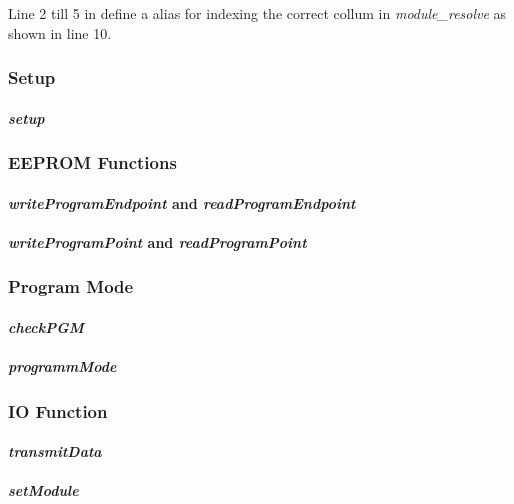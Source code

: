 

Line 2 till 5 in  define a alias for indexing the correct collum in \textit{module_resolve} as shown in line 10.

\subsubsection{Setup}
\paragraph{\textit{setup}}
\pagebreak

\subsubsection{EEPROM Functions}
\paragraph{\textit{writeProgramEndpoint} and \textit{readProgramEndpoint}}
\paragraph{\textit{writeProgramPoint} and \textit{readProgramPoint}}
\pagebreak

\subsubsection{Program Mode}
\paragraph{\textit{checkPGM}}
\paragraph{\textit{programmMode}}
\pagebreak

\subsubsection{IO Function}
\paragraph{\textit{transmitData}}
\paragraph{\textit{setModule}}
